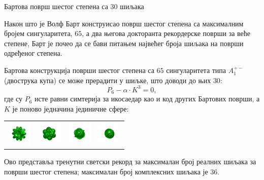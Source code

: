 \documentclass[sr]{./../../common/SurferDesc}%
\begin{document}
\footnotesize



\begin{surferPage}
  \begin{surferTitle}Бартова површ шестог степена са 30 шиљака\end{surferTitle}  

    Након што је Волф Барт конструисао површ шестог степена са максималним бројем 
	сингуларитета, $65$, а два његова докторанта рекордерске површи за веће степене, 
    Барт је почео да се бави питањем највећег броја шиљака на површи одређеног степена.

   Бартова конструкција површи шестог степена са $65$ сингуларитета типа 
    $A_1^{+-}$ (двострука купа) се може прерадити у шиљке, што доводи до њих  $30$: 
    \[P_6 - \alpha \cdot K^3=0,\]
  где су  $P_6$ исте равни симтерија за икосаедар
    као и код других Бартових површи, а $K$ је
    поново једначина јединичне сфере:
    \vspace*{-0.4em}
    \begin{center}
      \begin{tabular}{c@{\ }c@{\ }c@{\ }c}
        \includegraphics[height=1.2cm]{./../../common/images/barthsextic_30A2}
        &
        \includegraphics[height=1.2cm]{./../../common/images/barthsextic_30A2_3}
        &
        \includegraphics[height=1.2cm]{./../../common/images/barthsextic_30A2_5}
        &
        \includegraphics[height=1.2cm]{./../../common/images/barthsextic_30A2_6}
      \end{tabular}
    \end{center}    
    \vspace*{-0.3em}
     Ово представља тренутни светски рекорд за максималан број реалних шиљака за површи шестог степена;
	 максималан број комплексних шиљака је  $36$. 



  \begin{surferText}
     \end{surferText}
\end{surferPage}
\end{document}
